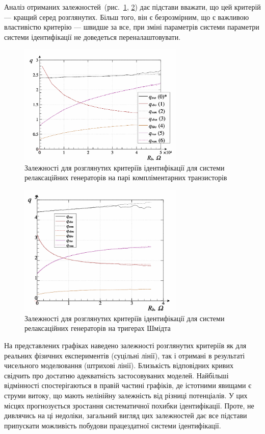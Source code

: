 Аналіз отриманих залежностей~(рис.~\ref{atu:f:relax3d_q}, \ref{atu:f:relax3ds_q})
дає підстави вважати, що цей критерій --- кращий серед
розглянутих. Більш того, він є безрозмірним, що є важливою
властивістю критерію --- швидше за все, при зміні параметрів
системи параметри системи ідентифікації не
доведеться переналаштовувати.

\begin{figure}[htb!]
  \centerline{\includegraphics[width=0.7\textwidth]{p/relax3d_read_q-p_q1.png} }
  \caption{Залежності для розглянутих критеріїв ідентифікації для системи релаксаційних генераторів на парі компліментарних транзисторів}
  \label{atu:f:relax3d_q}
\end{figure}

\begin{figure}[htb!]
  \centerline{\includegraphics[width=0.7\textwidth]{p/relax3ds_read_q-p_q1.png} }
\caption{Залежності для розглянутих критеріїв ідентифікації для системи релаксаційних генераторів на тригерах Шмідта}
  \label{atu:f:relax3ds_q}
\end{figure}

На представлених графіках наведено залежності розглянутих
критеріїв як для реальних фізичних експериментів (суцільні
лінії), так і отримані в результаті чисельного моделювання
(штрихові лінії). Близькість відповідних кривих свідчить про
достатню адекватність застосовуваних моделей. Найбільші
відмінності спостерігаються в правій частині графіків,
де істотними явищами є струми витоку, що мають нелінійну
залежність від різниці потенціалів. У цих місцях прогнозується
зростання систематичної похибки ідентифікації. Проте, не
дивлячись на ці недоліки, загальний вигляд цих залежностей
дає все підстави припускати можливість побудови працездатної
системи ідентифікації.



